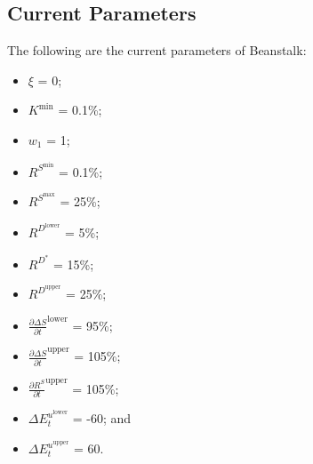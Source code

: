 \documentclass[class=article, crop=false]{standalone}
\begin{document}
\subsection{Current Parameters}
The following are the current parameters of Beanstalk:
\begin{itemize}[itemsep=3pt,leftmargin=16pt]
    \item $\xi$ = 0;
    \item $K^{\text{min}}$ = 0.1\%;
    \item $w_1$ = 1;
    \item $R^{S^{\text{min}}}$ = 0.1\%;
    \item $R^{S^{\text{max}}}$ = 25\%;
    \item $R^{D^{\text{lower}}}$ = 5\%;
    \item $R^{D^*}$ = 15\%;
    \item $R^{D^{\text{upper}}}$ = 25\%;
    \item $\frac{\partial \Delta S}{\partial t}^{\text{lower}}$ = 95\%;
    \item $\frac{\partial \Delta S}{\partial t}^{\text{upper}}$ = 105\%;
    \item $\frac{\partial R^S}{\partial t}^{\text{upper}}$ = 105\%;
    \item $\Delta E_{t}^{u^{\text{lower}}}$ = -60; and
    \item $\Delta E_{t}^{u^{\text{upper}}}$ = 60.
\end{itemize}
\end{document}
